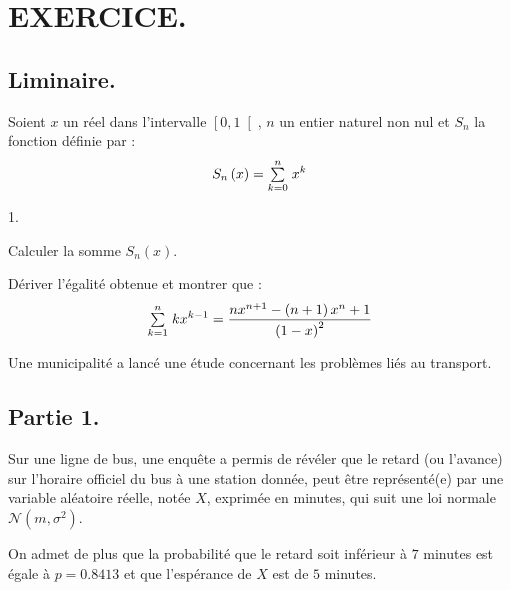 \documentclass[11pt]{article}%
\begin{document}
\section{EXERCICE.}

\subsection{Liminaire.}

Soient $x$ un réel dans l'intervalle $\left[ 0,1\right[ $, $n$ un
entier
naturel non nul et $S_{n}$ la fonction définie par :
\[
S_{n}\left( x\right) = {\textstyle\sum\limits_{k = 0}^{n}}\hspace{.1cm}x^{k}
\]

\begin{noliste}{1.}
 \setlength{\itemsep}{4mm}
\item Calculer la somme $S_{n}\left( x\right) $.

\item Dériver l'égalité obtenue et montrer que :
\[
{\textstyle\sum\limits_{k = 1}^{n}}\hspace{.1cm}kx^{k-1} = \frac{nx^{n + 1}-\left( n + 1\right) x^{n} +
1}{\left(
1-x\right) ^{2}}
\]
\end{noliste}

Une municipalité a lancé une étude concernant les problèmes
liés au transport.

\subsection{Partie 1.}

Sur une ligne de bus, une enquête a permis de révéler que le
retard (ou l'avance) sur l'horaire officiel du bus à une station
donnée, peut être représenté(e) par une variable aléatoire réelle,
notée $X$, exprimée en minutes, qui suit une loi normale
$\mathcal{N}\left( m,\sigma ^{2}\right) $.

On admet de plus que la probabilité que le retard soit inférieur 
à $7$ minutes est égale à $p = 0.8413$ et que l'espérance de $X
$ est de $5$ minutes.
\end{document}
